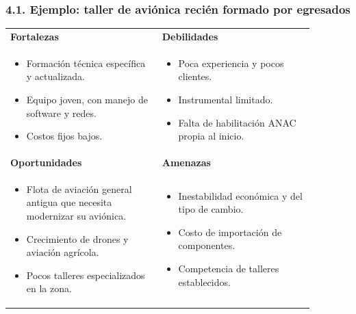 \subsubsection*{4.1. Ejemplo: taller de aviónica recién formado por egresados}
\begin{center}
\small
\begin{tabular}{|p{0.44\linewidth}|p{0.44\linewidth}|}
\hline
\textbf{Fortalezas} & \textbf{Debilidades} \\
\begin{itemize}[leftmargin=*,nosep]
  \item Formación técnica específica y actualizada.
  \item Equipo joven, con manejo de software y redes.
  \item Costos fijos bajos.
\end{itemize}
&
\begin{itemize}[leftmargin=*,nosep]
  \item Poca experiencia y pocos clientes.
  \item Instrumental limitado.
  \item Falta de habilitación ANAC propia al inicio.
\end{itemize}
\\ \hline
\textbf{Oportunidades} & \textbf{Amenazas} \\
\begin{itemize}[leftmargin=*,nosep]
  \item Flota de aviación general antigua que necesita modernizar su aviónica.
  \item Crecimiento de drones y aviación agrícola.
  \item Pocos talleres especializados en la zona.
\end{itemize}
&
\begin{itemize}[leftmargin=*,nosep]
  \item Inestabilidad económica y del tipo de cambio.
  \item Costo de importación de componentes.
  \item Competencia de talleres establecidos.
\end{itemize}
\\ \hline
\end{tabular}
\end{center}

